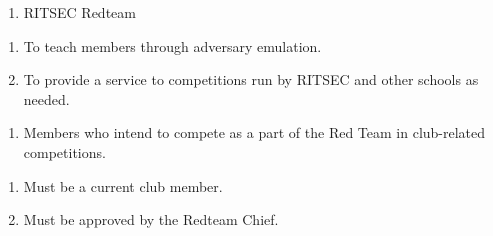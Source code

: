 

\begin{enumerate}
	\item RITSEC Redteam
\end{enumerate}


\begin{enumerate}
	\item To teach members through adversary emulation.
	\item To provide a service to competitions run by RITSEC and other schools as needed.
\end{enumerate}


\begin{enumerate}
	\item Members who intend to compete as a part of the Red Team in club-related
	      competitions.
\end{enumerate}


\begin{enumerate}
	\item Must be a current club member.
	\item Must be approved by the Redteam Chief.
\end{enumerate}